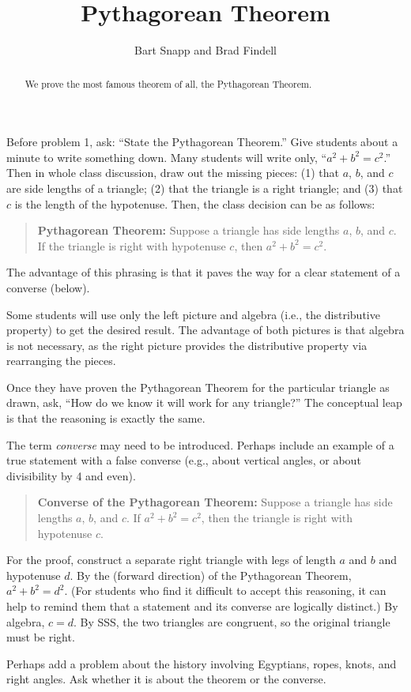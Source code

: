 \documentclass[nooutcomes]{ximera}
\title{Pythagorean Theorem}
\author{Bart Snapp and Brad Findell}
\begin{document}
\begin{abstract}
  We prove the most famous theorem of all, the Pythagorean Theorem.
\end{abstract}
\maketitle

\begin{teachingnote}
Before problem 1, ask:  ``State the Pythagorean Theorem.''  Give students about a minute to write something down.  Many students will write only, ``$a^2 + b^2 = c^2$.''  Then in whole class discussion, draw out the missing pieces:  (1) that $a$, $b$, and $c$ are side lengths of a triangle;  (2) that the triangle is a right triangle; and (3) that $c$ is the length of the hypotenuse.  Then, the class decision can be as follows: 
 
\begin{quote}\textbf{Pythagorean Theorem:}  Suppose a triangle has side lengths $a$, $b$, and $c$.  If the triangle is right with hypotenuse $c$, then $a^2 + b^2 = c^2$. 
\end{quote}
The advantage of this phrasing is that it paves the way for a clear statement of a converse (below).   

Some students will use only the left picture and algebra (i.e., the distributive property) to get the desired result.  The advantage of both pictures is that algebra is not necessary, as the right picture provides the distributive property via rearranging the pieces.  

Once they have proven the Pythagorean Theorem for the particular triangle as drawn, ask, ``How do we know it will work for any triangle?''  The conceptual leap is that the reasoning is exactly the same.  

The term \emph{converse} may need to be introduced.  Perhaps include an example of a true statement with a false converse (e.g., about vertical angles, or about divisibility by 4 and even).  

\begin{quote}
\textbf{Converse of the Pythagorean Theorem:}  Suppose a triangle has side lengths $a$, $b$, and $c$.  If $a^2 + b^2 = c^2$, then the triangle is right with hypotenuse $c$. 
\end{quote}

For the proof, construct a separate right triangle with legs of length $a$ and $b$ and hypotenuse $d$.  By the (forward direction) of the Pythagorean Theorem, $a^2+b^2=d^2$.  (For students who find it difficult to accept this reasoning, it can help to remind them that a statement and its converse are logically distinct.)  By algebra, $c=d$.  By SSS, the two triangles are congruent, so the original triangle must be right.  

Perhaps add a problem about the history involving Egyptians, ropes, knots, and right angles.  Ask whether it is about the theorem or the converse. 
\end{teachingnote}
\end{document}
